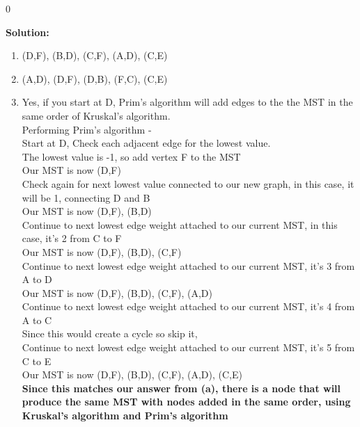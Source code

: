 \documentclass[9pt]{article}
\def\solutions{0}
\newcommand{\ben}{\begin{enumerate}}
\newcommand{\een}{\end{enumerate}}
\begin{document}
  \if\solutions0
  \vspace{2mm}

  \textbf{Solution:}   \\
  \ben
      \item (D,F), (B,D), (C,F), (A,D), (C,E)
      \item (A,D), (D,F), (D,B), (F,C), (C,E)
      \item Yes, if you start at D, Prim's algorithm will add edges to the the MST in the same order of Kruskal's algorithm.
      \\Performing Prim's algorithm -
      \\Start at D, Check each adjacent edge for the lowest value.
      \\The lowest value is -1, so add vertex F to the MST
      \\Our MST is now (D,F)
      \\Check again for next lowest value connected to our new graph, in this case, it will be 1, connecting D and B
      \\Our MST is now (D,F), (B,D)
      \\Continue to next lowest edge weight attached to our current MST, in this case, it's 2 from C to F
      \\Our MST is now (D,F), (B,D), (C,F)
      \\Continue to next lowest edge weight attached to our current MST, it's 3 from A to D
      \\Our MST is now (D,F), (B,D), (C,F), (A,D)
      \\Continue to next lowest edge weight attached to our current MST, it's 4 from A to C
      \\Since this would create a cycle so skip it,
      \\Continue to next lowest edge weight attached to our current MST, it's 5 from C to E
      \\Our MST is now (D,F), (B,D), (C,F), (A,D), (C,E)\\
      \textbf{Since this matches our answer from (a), there is a node that will produce the same MST with nodes added in the same order, using Kruskal's algorithm and Prim's algorithm}
  \een

\fi

\newpage
\end{document}
